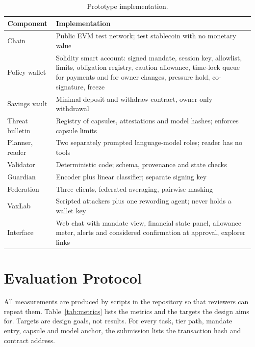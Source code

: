 \documentclass[10pt,a4paper,twocolumn]{article}
\newcommand{\tblfont}{\footnotesize}
\begin{document}
\begin{table}[t]
\caption{Prototype implementation.}
\label{tab:stack}
\tblfont
\begin{tabularx}{\columnwidth}{@{}P{23mm} L@{}}
\toprule
\textbf{Component} & \textbf{Implementation} \\
\midrule
Chain & Public EVM test network; test stablecoin with no monetary value \\
Policy wallet & Solidity smart account: signed mandate, session key, allowlist, limits, obligation registry, caution allowance, time-lock queue for payments and for owner changes, pressure hold, co-signature, freeze \\
Savings vault & Minimal deposit and withdraw contract, owner-only withdrawal \\
Threat bulletin & Registry of capsules, attestations and model hashes; enforces capsule limits \\
Planner, reader & Two separately prompted language-model roles; reader has no tools \\
Validator & Deterministic code; schema, provenance and state checks \\
Guardian & Encoder plus linear classifier; separate signing key \\
Federation & Three clients, federated averaging, pairwise masking \\
VaxLab & Scripted attackers plus one rewording agent; never holds a wallet key \\
Interface & Web chat with mandate view, financial state panel, allowance meter, alerts and considered confirmation at approval, explorer links \\
\bottomrule
\end{tabularx}
\end{table}

\section{Evaluation Protocol}
\label{sec:eval}

All measurements are produced by scripts in the repository so that reviewers can repeat
them. Table~\ref{tab:metrics} lists the metrics and the targets the design aims for.
Targets are design goals, not results. For every task, tier path, mandate entry, capsule
and model anchor, the submission lists the transaction hash and contract address.
\end{document}
